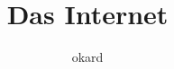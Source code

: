 \documentclass{beamer}
\title{Das Internet}
\author{okard}
\begin{document}
\frame{ \titlepage }








\end{document}
